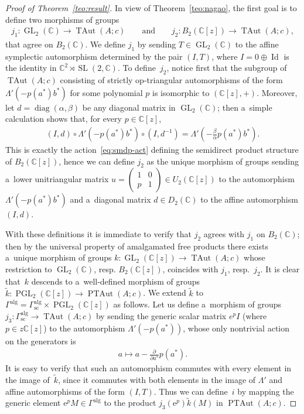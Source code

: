 \documentclass[11pt]{article}
\newcommand{\bb}[1]{\mathbb{#1}}
\newcommand{\app}[3]{#1\colon #2\to #3}
\newcommand{\smm}[1]{\left(\begin{smallmatrix} #1\end{smallmatrix}\right)}
\DeclareMathOperator{\id}{Id}
\DeclareMathOperator{\diag}{diag}
\DeclareMathOperator{\GL}{GL}
\DeclareMathOperator{\SL}{SL}
\DeclareMathOperator{\PGL}{PGL}
\DeclareMathOperator{\TAut}{TAut}
\DeclareMathOperator{\PTAut}{PTAut}
\begin{document}
\begin{proof}[Proof of Theorem~\ref{teo:result}]
In view of Theorem~\ref{teo:nagao}, the f\/irst goal is to def\/ine two
morphisms of groups
\begin{gather*}
\app{j_{1}}{\GL_{2}(\bb{C})}{\TAut(A;c)}
\qquad
\text{and} %
\qquad
\app{j_{2}}{B_{2}(\bb{C}[z])}{\TAut(A;c)},
\end{gather*}
that agree on \(B_{2}(\bb{C})\).
We def\/ine \(j_{1}\) by sending \(T\in \GL_{2}(\bb{C})\) to the af\/f\/ine symplectic automorphism
determined by the pair \((I,T)\), where \(I = 0\oplus \id\) is the identity in \(\bb{C}^{2}\rtimes
\SL(2,\bb{C})\).
To def\/ine~\(j_{2}\), notice f\/irst that the subgroup of \(\TAut(A;c)\) consisting of strictly
op-triangular automorphisms of the form \(\Lambda'(-p(a^{*})b^{*})\) for some polynomial \(p\) is
isomorphic to \((\bb{C}[z],+)\).
Moreover, let \(d = \diag(\alpha,\beta)\) be any diagonal matrix in \(\GL_{2}(\bb{C})\); then a~simple
calculation shows that, for every \(p\in \bb{C}[z]\),
\begin{gather*}%
(I,d)\circ\Lambda'(-p(a^{*})b^{*})\circ(I,d^{-1})=\Lambda'\left(-\frac{\beta}{\alpha}p(a^{*})b^{*}\right).
\end{gather*}
This is exactly the action~\eqref{eq:smdp-act} def\/ining the semidirect product structure of
\(B_{2}(\bb{C}[z])\), hence we can def\/ine \(j_{2}\) as the unique morphism of groups sending a~lower
unitriangular matrix \(u = \smm{1 & 0
\\
p & 1}\in U_{2}(\bb{C}[z])\) to the automorphism \(\Lambda'(-p(a^{*})b^{*})\) and a~diagonal matrix \(d\in
D_{2}(\bb{C})\) to the af\/f\/ine automorphism \((I,d)\).

With these def\/initions it is immediate to verify that \(j_{2}\) agrees with \(j_{1}\) on
\(B_{2}(\bb{C})\); then by the universal property of amalgamated free products there exists a~unique
morphism of groups \(\app{k}{\GL_{2}(\bb{C}[z])}{\TAut(A;c)}\) whose restriction to \(\GL_{2}(\bb{C})\),
resp.
\(B_{2}(\bb{C}[z])\), coincides with \(j_{1}\), resp.~\(j_{2}\).
It is clear that~\(k\) descends to a~well-def\/ined morphism of groups
\(\app{\tilde{k}}{\PGL_{2}(\bb{C}[z])}{\PTAut(A;c)}\).
We extend \(\tilde{k}\) to \(\Gamma^{\mathrm{alg}} = \Gamma^{\mathrm{alg}}_{\mathrm{sc}} \times
\PGL_{2}(\bb{C}[z])\) as follows.
Let us def\/ine a~morphism of groups \(\app{j_{3}}{\Gamma^{\mathrm{alg}}_{\mathrm{sc}}}{\TAut(A;c)}\) by
sending the generic scalar matrix \(e^{p}I\) (where \(p\in z\bb{C}[z]\)) to the automorphism
\(\Lambda'(-p(a^{*}))\), whose only nontrivial action on the generators is
\begin{gather}
\label{eq:sc-au}
a\mapsto a-\frac{\partial}{\partial a^{*}}p(a^{*}).
\end{gather}
It is easy to verify that such an automorphism commutes with every element in the image of~\(\tilde{k}\),
since it commutes with both elements in the image of \(\Lambda'\) and af\/f\/ine automorphisms of the form
\((I,T)\).
Thus we can def\/ine~\(i\) by mapping the generic element \(\mathrm{e}^{p}M\in \Gamma^{\mathrm{alg}}\) to
the product \(j_{3}(\mathrm{e}^{p}) \tilde{k}(M)\) in \(\PTAut(A;c)\).


\end{proof}
\end{document}
